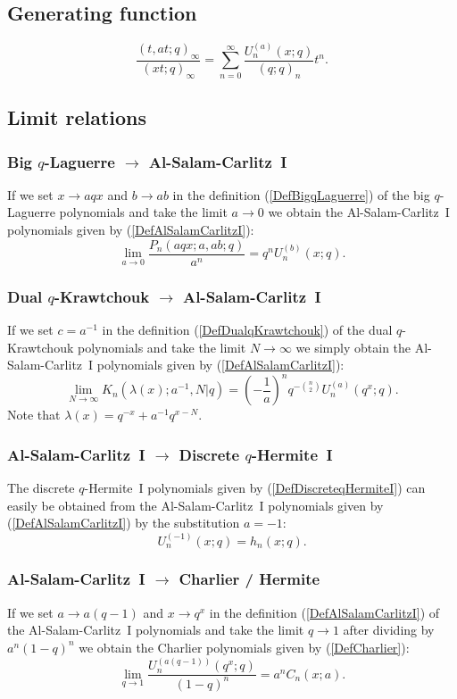 \documentclass[envcountchap,graybox]{svmono}
\newcounter{rom}
\begin{document}
{{\subsection*{Generating function}
\begin{equation}
\label{GenAlSalamCarlitzI}
\frac{(t,at;q)_{\infty}}{(xt;q)_{\infty}}=
\sum_{n=0}^{\infty}\frac{U_n^{(a)}(x;q)}{(q;q)_n}t^n.
\end{equation}

\subsection*{Limit relations}

\subsubsection*{Big $q$-Laguerre $\rightarrow$ Al-Salam-Carlitz~I}
If we set $x\rightarrow aqx$ and $b\rightarrow ab$ in the definition
(\ref{DefBigqLaguerre}) of the big $q$-Laguerre polynomials and take the
limit $a\rightarrow 0$ we obtain the Al-Salam-Carlitz~I polynomials given by
(\ref{DefAlSalamCarlitzI}):
$$\lim_{a\rightarrow 0}\frac{P_n(aqx;a,ab;q)}{a^n}=q^nU_n^{(b)}(x;q).$$

\subsubsection*{Dual $q$-Krawtchouk $\rightarrow$ Al-Salam-Carlitz~I}
If we set $c=a^{-1}$ in the definition (\ref{DefDualqKrawtchouk})
of the dual $q$-Krawtchouk polynomials and take the limit
$N\rightarrow\infty$ we simply obtain the Al-Salam-Carlitz~I polynomials
given by (\ref{DefAlSalamCarlitzI}):
$$\lim_{N\rightarrow\infty}K_n(\lambda(x);a^{-1},N|q)=
\left(-\frac{1}{a}\right)^nq^{-\binom{n}{2}}U_n^{(a)}(q^x;q).$$
Note that $\lambda(x)=q^{-x}+a^{-1}q^{x-N}$.

\subsubsection*{Al-Salam-Carlitz~I $\rightarrow$ Discrete $q$-Hermite~I}
The discrete $q$-Hermite~I polynomials given by
(\ref{DefDiscreteqHermiteI}) can easily be obtained from the
Al-Salam-Carlitz~I polynomials given by (\ref{DefAlSalamCarlitzI}) by the
substitution $a=-1$:
\begin{equation}
U_n^{(-1)}(x;q)=h_n(x;q).
\end{equation}

\subsubsection*{Al-Salam-Carlitz~I $\rightarrow$ Charlier / Hermite}
If we set $a\rightarrow a(q-1)$ and $x\rightarrow q^x$ in the definition
(\ref{DefAlSalamCarlitzI}) of the Al-Salam-Carlitz~I polynomials and take the
limit $q\rightarrow 1$ after dividing by $a^n(1-q)^n$ we obtain the Charlier
polynomials given by (\ref{DefCharlier}):
\begin{equation}
\lim_{q\rightarrow 1}\frac{U_n^{(a(q-1))}(q^x;q)}{(1-q)^n}=a^nC_n(x;a).
\end{equation}

}}
\end{document}
